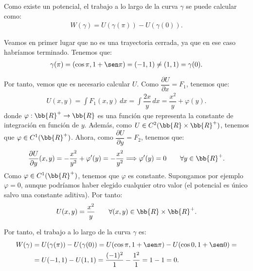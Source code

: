 \documentclass[12pt]{article}
\begin{document}
\begin{ejercicio}
        Como existe un potencial, el trabajo a lo largo de la curva $\gamma$ se puede calcular como:
        \begin{align*}
            W(\gamma) = U(\gamma(\pi)) - U(\gamma(0)).
        \end{align*}

        Veamos en primer lugar que no es una trayectoria cerrada, ya que en ese caso habríamos terminado. Tenemos que:
        \begin{align*}
            \gamma(\pi) = (\cos \pi, 1 + \sen \pi) = (-1,1) \neq (1,1) = \gamma(0).
        \end{align*}

        Por tanto, vemos que es necesario calcular $U$. Como $\dfrac{\partial U}{\partial x} = F_1$, tenemos que:
        \begin{align*}
            U(x,y) = \int F_1(x,y)\,dx = \int \dfrac{2x}{y}\,dx = \dfrac{x^2}{y} + \varphi(y).
        \end{align*}
        donde $\varphi:\bb{R}^+\to \bb{R}$ es una función que representa la constante de integración en función de $y$. Además, como $U\in C^2(\bb{R}\times \bb{R}^+)$, tenemos que $\varphi \in C^1(\bb{R}^+)$.
        Ahora, como $\dfrac{\partial U}{\partial y} = F_2$, tenemos que:
        \begin{align*}
            \dfrac{\partial U}{\partial y}(x,y) = -\dfrac{x^2}{y^2} + \varphi'(y) = -\dfrac{x^2}{y^2} \Longrightarrow \varphi'(y) = 0  \qquad \forall y \in \bb{R}^+.
        \end{align*}
        Como $\varphi\in C^1(\bb{R}^+)$, tenemos que $\varphi$ es constante. Supongamos por ejemplo $\varphi=0$, aunque podríamos haber elegido cualquier otro valor (el potencial es único salvo una constante aditiva). Por tanto:
        \begin{align*}
            U(x,y) = \dfrac{x^2}{y} \qquad \forall (x,y) \in \bb{R}\times \bb{R}^+.
        \end{align*}

        Por tanto, el trabajo a lo largo de la curva $\gamma$ es:
        \begin{align*}
            W(\gamma) &= U(\gamma(\pi)) - U(\gamma(0)) = U(\cos \pi, 1 + \sen \pi) - U(\cos 0, 1 + \sen 0) =\\
            &= U(-1,1) - U(1,1) = \dfrac{(-1)^2}{1} - \dfrac{1^2}{1} = 1 - 1 = 0.
        \end{align*}

    \end{ejercicio}
\end{document}
